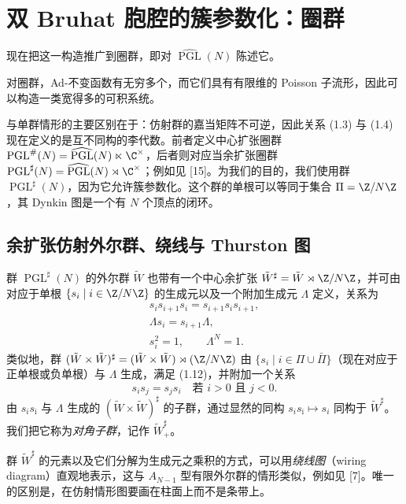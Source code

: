 \section{双 Bruhat 胞腔的簇参数化：圈群}

现在把这一构造推广到圈群，即对 $\widehat{\operatorname{PGL}}(N)$ 陈述它。

对圈群，Ad-不变函数有无穷多个，而它们具有有限维的 Poisson 子流形，因此可以构造一类宽得多的可积系统。

与单群情形的主要区别在于：仿射群的嘉当矩阵不可逆，因此关系 (1.3) 与 (1.4) 现在定义的是互不同构的李代数。前者定义中心扩张圈群 $\operatorname{PGL}^{\#}(N)=\widehat{\operatorname{PGL}}(N)\ltimes\C^\times$，后者则对应当余扩张圈群 $\operatorname{PGL}^{\sharp}(N)=\widehat{\operatorname{PGL}}(N)\rtimes\C^\times$；例如见 [15]。为我们的目的，我们使用群 $\operatorname{PGL}^{\sharp}(N)$，因为它允许簇参数化。这个群的单根可以等同于集合 $\Pi=\Z/N\Z$，其 Dynkin 图是一个有 $N$ 个顶点的闭环。

\subsection{余扩张仿射外尔群、绕线与 Thurston 图}

群 $\operatorname{PGL}^{\sharp}(N)$ 的外尔群 $\tilde W$ 也带有一个中心余扩张 $\tilde W^{\sharp}=\tilde W\rtimes\Z/N\Z$，并可由对应于单根 $\{s_i\mid i\in\Z/N\Z\}$ 的生成元以及一个附加生成元 $\Lambda$ 定义，关系为
\begin{equation}\label{eq:1.12}
\begin{gathered}
s_is_{i+1}s_i=s_{i+1}s_is_{i+1},\\
\Lambda s_i=s_{i+1}\Lambda,\\
s_i^2=1,\qquad \Lambda^N=1.
\end{gathered}
\tag{1.12}
\end{equation}
类似地，群 $(\tilde W\times\tilde W)^{\sharp}=(\tilde W\times\tilde W)\rtimes(\Z/N\Z)$ 由 $\{s_i\mid i\in\Pi\cup\bar\Pi\}$（现在对应于正单根或负单根）与 $\Lambda$ 生成，满足 (1.12)，并附加一个关系
\begin{equation}\label{eq:1.13}
s_is_j=s_js_i\quad\text{若 } i>0 \text{ 且 } j<0.
\tag{1.13}
\end{equation}
由 $s_is_{\bar\imath}$ 与 $\Lambda$ 生成的 $(\tilde W\times\tilde W)^{\sharp}$ 的子群，通过显然的同构 $s_is_{\bar\imath}\mapsto s_i$ 同构于 $\tilde W^{\sharp}$。我们把它称为\emph{对角子群}，记作 $\tilde W^{\sharp}_+$。

群 $\tilde W^{\sharp}$ 的元素以及它们分解为生成元之乘积的方式，可以用\emph{绕线图}（wiring diagram）直观地表示，这与 $A_{N-1}$ 型有限外尔群的情形类似，例如见 [7]。唯一的区别是，在仿射情形图要画在柱面上而不是条带上。

